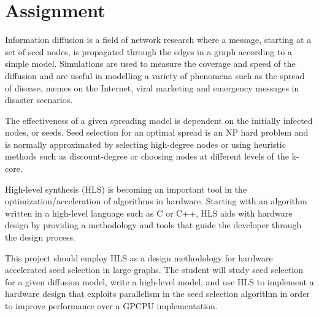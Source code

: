 \section*{Assignment}
Information diffusion is a field of network research where a message, starting
at a set of seed nodes, is propagated through the edges in a graph according to
a simple model. Simulations are used to measure the coverage and speed of the
diffusion and are useful in modelling a variety of phenomena such as the spread
of disease, memes on the Internet, viral marketing and emergency messages in
disaster scenarios.

The effectiveness of a given spreading model is dependent on the initially
infected nodes, or seeds. Seed selection for an optimal spread is an NP hard
problem and is normally approximated by selecting high-degree nodes or using
heuristic methods such as discount-degree or choosing nodes at different levels
of the k-core.

High-level synthesis (HLS) is becoming an important tool in the
optimization/acceleration of algorithms in hardware. Starting with an algorithm
written in a high-level language such as C or C++, HLS aids with hardware
design by providing a methodology and tools that guide the developer through
the design process.

This project should employ HLS as a design methodology for hardware accelerated
seed selection in large graphs. The student will study seed selection for a
given diffusion model, write a high-level model, and use HLS to implement a
hardware design that exploits parallelism in the seed selection algorithm in
order to improve performance over a GPCPU implementation.
